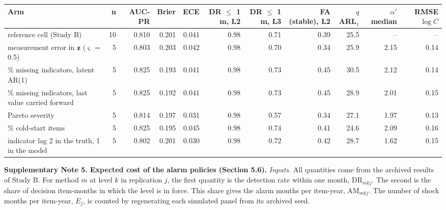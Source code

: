 \documentclass[10pt,a4paper]{article}
\begin{document}
\vspace{6pt}
\noindent\begin{minipage}{\linewidth}
\centering\scriptsize
\begin{tabular}{>{\raggedright\arraybackslash}p{3.4cm}rrrrrrrrrr}
\toprule
Arm & n & AUC-PR & Brier & ECE & DR $\le$ 1 m, L2 & DR $\le$ 1 m, L3 & FA (stable), L2 & $q$ ARL$_1$ & $\alpha'$ median & RMSE $\log C$ \\ \midrule
reference cell (Study B) & 10 & 0.810 & 0.201 & 0.041 & 0.98 & 0.71 & 0.39 & 25.5 & – & – \\
measurement error in $\mathbf{z}$ ($\varsigma$ = 0.5) & 5 & 0.803 & 0.203 & 0.042 & 0.98 & 0.70 & 0.34 & 25.9 & 2.15 & 0.14 \\
15\% missing indicators, latent AR(1) & 5 & 0.825 & 0.193 & 0.041 & 0.98 & 0.73 & 0.45 & 30.5 & 2.12 & 0.14 \\
15\% missing indicators, last value carried forward & 5 & 0.825 & 0.192 & 0.041 & 0.98 & 0.73 & 0.45 & 28.9 & 2.01 & 0.15 \\
Pareto severity & 5 & 0.814 & 0.197 & 0.031 & 0.98 & 0.57 & 0.34 & 27.1 & 1.97 & 0.13 \\
20\% cold-start items & 5 & 0.825 & 0.195 & 0.045 & 0.98 & 0.74 & 0.41 & 24.6 & 2.09 & 0.16 \\
indicator lag 2 in the truth, 1 in the model & 5 & 0.802 & 0.201 & 0.030 & 0.98 & 0.72 & 0.42 & 28.7 & 1.62 & 0.15 \\
\bottomrule
\end{tabular}
\end{minipage}
\vspace{8pt}

\textbf{Supplementary Note 5. Expected cost of the alarm policies (Section 5.6).}
\textit{Inputs.} All quantities come from the archived results of Study B. For method $m$ at level $k$ in replication $j$, the first quantity is the detection rate within one month, $\mathrm{DR}_{mkj}$. The second is the share of decision item-months in which the level is in force. This share gives the alarm months per item-year, $\mathrm{AM}_{mkj}$. The number of shock months per item-year, $E_j$, is counted by regenerating each simulated panel from its archived seed.
\end{document}
